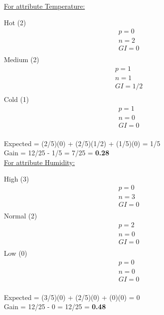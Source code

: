 \documentclass[8pt, fullpage,letterpaper]{article}
\begin{document}
\begin{enumerate}
\begin{enumerate}
\begin{enumerate}
\begin{enumerate}
\begin{itemize}
						\underline {For attribute Temperature:} 
							\vspace{-5pt}
							\begin{multicols}{3}
								Hot (2)
			 						\begin{align*}
									    	& p = 0\\
										& n = 2 \\
									    	& GI = 0\\
								      \end{align*}
								Medium (2)
			 						\begin{align*}
									    	& p = 1\\
										& n = 1 \\
									    	& GI = 1/2\\
								      \end{align*}
								Cold (1)
			 						\begin{align*}
									    	& p = 1\\
										& n = 0 \\
									    	& GI = 0\\
								      \end{align*}
							\end{multicols}
							\vspace{-20pt}
							Expected = (2/5)(0) + (2/5)(1/2) + (1/5)(0) = 1/5\\
							Gain = 12/25 - 1/5 = 7/25 = {\bf 0.28}\\

						\underline {For attribute Humidity:} 
							\vspace{-5pt}
							\begin{multicols}{3}
								High (3)
			 						\begin{align*}
									    	& p = 0\\
										& n = 3 \\
									    	& GI = 0\\
								      \end{align*}
								Normal (2)
			 						\begin{align*}
									    	& p = 2\\
										& n = 0 \\
									    	& GI = 0\\
								      \end{align*}
								Low (0)
			 						\begin{align*}
									    	& p = 0\\
										& n = 0 \\
									    	& GI = 0\\
								      \end{align*}
							\end{multicols}
							\vspace{-20pt}
							Expected = (3/5)(0) + (2/5)(0) + (0)(0) = 0\\
							Gain = 12/25 - 0 = 12/25 = {\bf 0.48}\\


\end{itemize}
\end{enumerate}
\end{enumerate}
\end{enumerate}
\end{enumerate}
\end{document}
